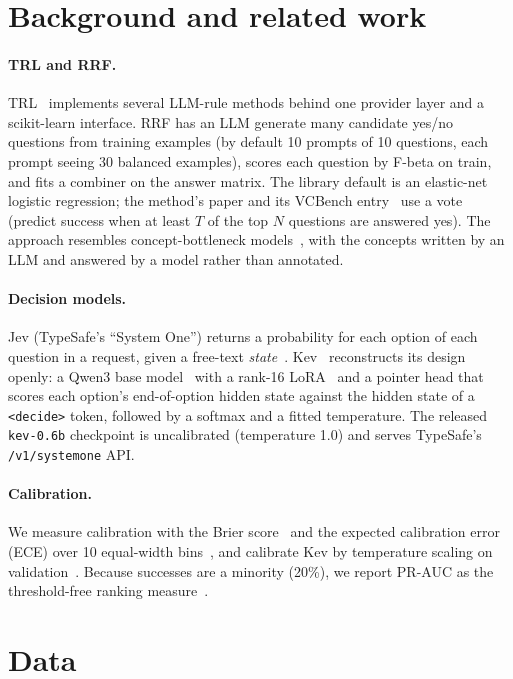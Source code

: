 \documentclass{article}
\begin{document}
\section{Background and related work}

\paragraph{TRL and RRF.} TRL~\citep{trl} implements several LLM-rule methods behind one provider
layer and a scikit-learn interface. RRF has an LLM generate many candidate yes/no questions from
training examples (by default 10 prompts of 10 questions, each prompt seeing 30 balanced
examples), scores each question by F-beta on train, and fits a combiner on the answer matrix.
The library default is an elastic-net logistic regression; the method's paper and its VCBench
entry~\citep{vcbench} use a vote (predict success when at least $T$ of the top $N$ questions are
answered yes). The approach resembles concept-bottleneck models~\citep{koh2020concept}, with the
concepts written by an LLM and answered by a model rather than annotated.

\paragraph{Decision models.} Jev (TypeSafe's ``System One'') returns a probability for each
option of each question in a request, given a free-text \emph{state}~\citep{jev}. Kev~\citep{kev}
reconstructs its design openly: a Qwen3 base model~\citep{qwen3} with a rank-16
LoRA~\citep{hu2022lora} and a pointer head that scores each option's end-of-option hidden state
against the hidden state of a \texttt{<decide>} token, followed by a softmax and a fitted
temperature. The released \texttt{kev-0.6b} checkpoint is uncalibrated (temperature 1.0) and
serves TypeSafe's \texttt{/v1/systemone} API.

\paragraph{Calibration.} We measure calibration with the Brier score~\citep{brier1950} and the
expected calibration error (ECE) over 10 equal-width bins~\citep{naeini2015ece}, and calibrate Kev
by temperature scaling on validation~\citep{guo2017calibration}. Because successes are a minority
(20\%), we report PR-AUC as the threshold-free ranking measure~\citep{saito2015prc}.

\section{Data}
\label{sec:data}
\end{document}
